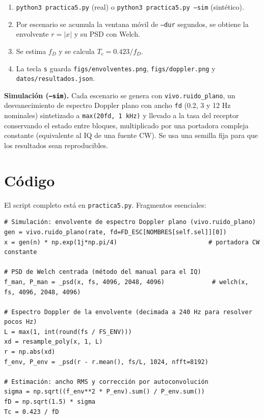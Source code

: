 \documentclass[11pt,a4paper]{article}
\begin{document}
\begin{enumerate}
  \item \texttt{python3 practica5.py} (real) o \texttt{python3 practica5.py --sim} (sintético).
  \item Por escenario se acumula la ventana móvil de \texttt{--dur} segundos, se obtiene la envolvente $r=|x|$ y su PSD con Welch.
  \item Se estima $f_D$ y se calcula $T_c = 0.423/f_D$.
  \item La tecla \texttt{s} guarda \texttt{figs/envolventes.png}, \texttt{figs/doppler.png} y \texttt{datos/resultados.json}.
\end{enumerate}

\textbf{Simulación (\texttt{--sim}).} Cada escenario se genera con \texttt{vivo.ruido\_plano}, un desvanecimiento de espectro Doppler plano con ancho \texttt{fd} (0.2, 3 y 12 Hz nominales) sintetizado a \texttt{max(20\textperiodcentered{}fd, 1 kHz)} y llevado a la tasa del receptor conservando el estado entre bloques, multiplicado por una portadora compleja constante (equivalente al IQ de una fuente CW). Se usa una semilla fija para que los resultados sean reproducibles.

\section{Código}

El script completo está en \texttt{practica5.py}. Fragmentos esenciales:

\begin{Verbatim}[breaklines=true,breakanywhere=true,fontsize=\small]
# Simulación: envolvente de espectro Doppler plano (vivo.ruido_plano)
gen = vivo.ruido_plano(rate, fd=FD_ESC[NOMBRES[self.sel]][0])
x = gen(n) * np.exp(1j*np.pi/4)                         # portadora CW constante

# PSD de Welch centrada (método del manual para el IQ)
f_man, P_man = _psd(x, fs, 4096, 2048, 4096)             # welch(x, fs, 4096, 2048, 4096)

# Espectro Doppler de la envolvente (decimada a 240 Hz para resolver pocos Hz)
L = max(1, int(round(fs / FS_ENV)))
xd = resample_poly(x, 1, L)
r = np.abs(xd)
f_env, P_env = _psd(r - r.mean(), fs/L, 1024, nfft=8192)

# Estimación: ancho RMS y corrección por autoconvolución
sigma = np.sqrt((f_env**2 * P_env).sum() / P_env.sum())
fD = np.sqrt(1.5) * sigma
Tc = 0.423 / fD
\end{Verbatim}
\end{document}
